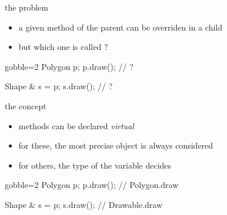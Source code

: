 \begin{frame}[fragile]
  \begin{block}{the problem}
    \begin{itemize}
    \item a given method of the parent can be overriden in a child
    \item but which one is called ?
    \end{itemize}
  \end{block}
  \begin{multicols}{2}
    \begin{cppcode*}{gobble=2}
      Polygon p;
      p.draw(); // ?
      
      Shape & s = p;
      s.draw(); // ?
    \end{cppcode*}
    \columnbreak
    \center
  \end{multicols}
\end{frame}

\begin{frame}[fragile]
  \begin{block}{the concept}
    \begin{itemize}
    \item methods can be declared {\it virtual}
    \item for these, the most precise object is always considered
    \item for others, the type of the variable decides
    \end{itemize}
  \end{block}
  \pause
  \begin{multicols}{2}
    \begin{cppcode*}{gobble=2}
      Polygon p;
      p.draw(); // Polygon.draw
      
      Shape & s = p;
      s.draw(); // Drawable.draw
    \end{cppcode*}
    \columnbreak
    \center
  \end{multicols}    
\end{frame}

